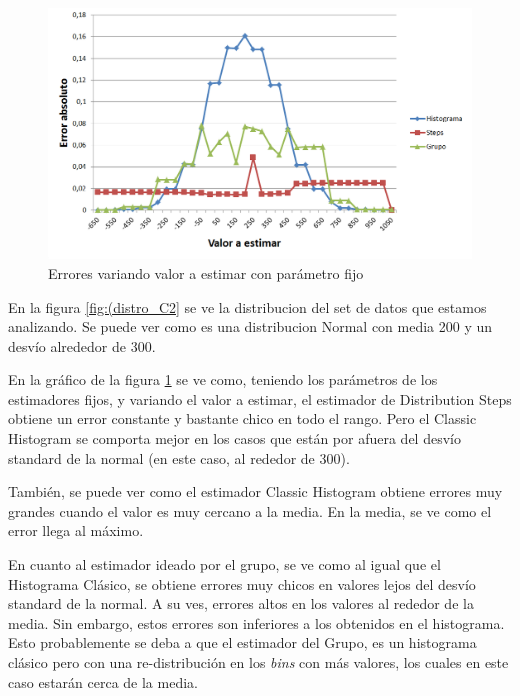 	\begin{figure}[H]
	  \begin{center}
	    \includegraphics[scale=.55]{imagenes/C2_variando_valor.png}
	    \caption{Errores variando valor a estimar con par\'ametro fijo} 
	    \label{fig:C2_variando_valor}
	  \end{center}
	\end{figure}
		
		En la figura \ref{fig:(distro_C2} se ve la distribucion del set de datos que estamos analizando. Se puede ver como es una distribucion Normal con media 200 y un desv\'io alrededor de 300.
		
		En la gr\'afico de la figura \ref{fig:C2_variando_valor} se ve como, teniendo los par\'ametros de los estimadores fijos, y variando el valor a estimar, el estimador de Distribution Steps obtiene un error constante y bastante chico en todo el rango. Pero el Classic Histogram se comporta mejor en los casos que est\'an por afuera del desv\'io standard de la normal (en este caso, al rededor de 300).
		
		Tambi\'en, se puede ver como el estimador Classic Histogram obtiene errores muy grandes cuando el valor es muy cercano a la media. En la media, se ve como el error llega al m\'aximo.
		
		En cuanto al estimador ideado por el grupo, se ve como al igual que el Histograma Cl\'asico, se obtiene errores muy chicos en valores lejos del desv\'io standard de la normal. A su ves, errores altos en los valores al rededor de la media. Sin embargo, estos errores son inferiores a los obtenidos en el histograma. Esto probablemente se deba a que el estimador del Grupo, es un histograma cl\'asico pero con una re-distribuci\'on en los \textit{bins} con m\'as valores, los cuales en este caso estar\'an cerca de la media.
	
